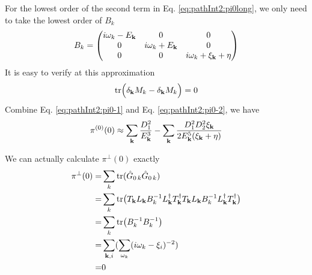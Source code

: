For the lowest order of the second term in Eq. \eqref{eq:pathInt2:pi0long}, we only need to take the lowest order of $B_{k}$
\begin{equation}
B_{k}=\begin{pmatrix}i\omega_{k}-E_{\mathbf{k}}&0&0\\0&i\omega_{k}+E_{\mathbf{k}}&0\\0&0&i\omega_{k}+\xi_{\mathbf{k}}+\eta\end{pmatrix}
\end{equation}
It is easy to verify at this approximation
\begin{equation}\label{eq:pathInt2:pi0-2}
\text{tr}\Big(\delta_{\mathbf{k}}M_{k}-\delta_{\mathbf{k}}M_{k}\Big)=0
\end{equation}
Combine Eq. \eqref{eq:pathInt2:pi0-1} and Eq. \eqref{eq:pathInt2:pi0-2}, we have 
\begin{equation}
\pi^{(0)}(0)\approx\sum_{\mathbf{k}}\frac{D_{1}^{2}}{E_{\mathbf{k}}^{3}}-\sum_{\mathbf{k}}\frac{D_{1}^{2}D_{2}^{2}\xi_{\mathbf{k}}}{2E_{\mathbf{k}}^{5}(\xi_{\mathbf{k}}+\eta)}\end{equation}

We can actually calculate  $\pi^{\perp}(0)$ exactly
\begin{equation}
\begin{split}
\pi^{\perp}(0)=&\sum_k\text{tr}(\hat{G}_{0\,k}\hat{G}_{0\,k})\\
	=&\sum_k\text{tr}\big(T_{\mathbf{k}}L_{\mathbf{k}}B_{k}^{-1}L_{\mathbf{k}}^{\dagger}T_{\mathbf{k}}^{\dagger}T_{\mathbf{k}}L_{\mathbf{k}}B_{k}^{-1}L_{\mathbf{k}}^{\dagger}T_{\mathbf{k}}^{\dagger}\big)\\
	=&\sum_k\text{tr}\big(B_{k}^{-1}B_{k}^{-1}\big)\\
	=&\sum_{\mathbf{k},i}(\sum_{\omega_{k}}(i\omega_{k}-\xi_{i})^{-2})\\
	=&0
\end{split}
\end{equation}


